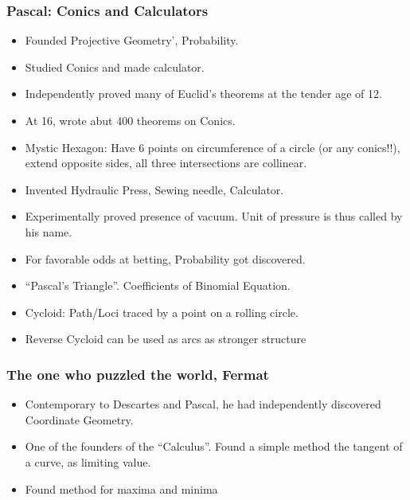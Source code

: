 \begin{frame}[fragile]
\frametitle{Pascal: Conics and Calculators}
\begin{itemize}
\item Founded Projective Geometry', Probability. 
\item Studied Conics and made calculator.
\item Independently proved many of Euclid's theorems at the tender age of 12.
\item At 16, wrote abut 400 theorems on Conics.
\item Mystic Hexagon: Have 6 points on circumference of  a circle (or any conics!!), extend opposite sides, all three intersections are collinear.
\item Invented Hydraulic Press, Sewing needle, Calculator.
\item Experimentally proved presence of vacuum. Unit of pressure is  thus called by his name.
\item For favorable odds at betting, Probability  got discovered.
\item ``Pascal's Triangle''. Coefficients of Binomial Equation.
\item Cycloid: Path/Loci traced by a point on a rolling circle.
\item Reverse Cycloid can be used as arcs as stronger structure
\end{itemize}
\end{frame}

\begin{frame}[fragile]
\frametitle{The one who puzzled the world, Fermat}
\begin{itemize}
\item Contemporary to Descartes and Pascal, he had independently discovered Coordinate Geometry.
\item One of the founders of the ``Calculus''. Found a simple method the tangent of a curve, as limiting value.
\item Found method for maxima and minima 
\end{itemize}
\end{frame}

